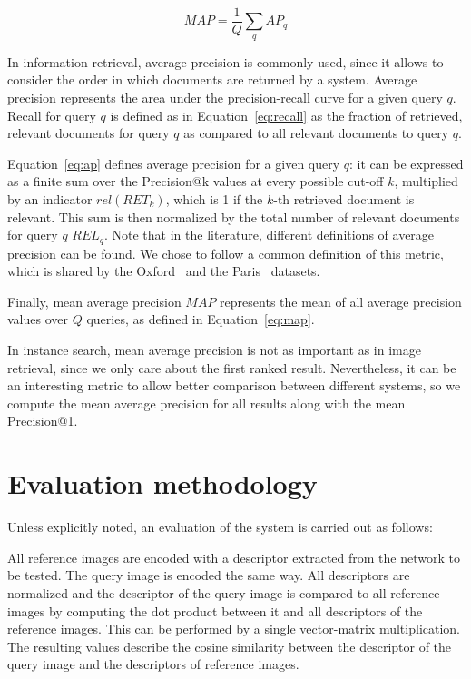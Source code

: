 \begin{equation}\label{eq:map}
MAP = \frac{1}{Q} \sum_q AP_q
\end{equation}

In information retrieval, average precision is commonly used, since it
allows to consider the order in which documents are returned by a system.
Average precision represents the area under the precision-recall curve
for a given query $q$. Recall for query $q$ is defined as in
Equation~\ref{eq:recall} as the fraction of retrieved, relevant documents
for query $q$ as compared to all relevant documents to query $q$.

Equation~\ref{eq:ap} defines average precision for a given query $q$:
it can be expressed as a finite sum
over the Precision@k values at every possible cut-off $k$, multiplied by an
indicator $rel(RET_k)$, which is 1 if the $k$-th retrieved document is
relevant. This sum is then normalized by the total number of relevant
documents for query $q$ $REL_q$.
Note that in the literature, different definitions of average precision can
be found. We chose to follow a common definition of this metric, which
is shared by the Oxford~\cite{philbin_object_2007} and the
Paris~\cite{philbin_lost_2008} datasets.

Finally, mean average precision $MAP$ represents the mean of all average
precision values over $Q$ queries, as defined in Equation~\ref{eq:map}.

In instance search, mean average precision is not as important as in image retrieval,
since we only care about the first ranked result. Nevertheless, it can be an interesting
metric to allow better comparison between different systems, so we compute
the mean average precision for all results along with the mean Precision@1.

\section{Evaluation methodology}\label{sec:evalmethod}
Unless explicitly noted, an evaluation of the system is carried out as
follows:

All reference images are encoded with a descriptor extracted from the
network to be tested. The query image is encoded the same way.
All descriptors are normalized and the descriptor of the query image
is compared to all reference images by computing the dot product between
it and all descriptors of the reference images. This can be performed
by a single vector-matrix multiplication. The resulting values describe
the cosine similarity between the descriptor of the query image
and the descriptors of reference images.

